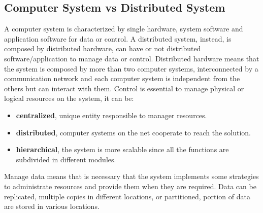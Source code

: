 \documentclass[11pt,a4paper]{article}
\begin{document}
\subsection{Computer System vs Distributed System}
A computer system is characterized by single hardware, system software and application software for data or control. A distributed system, instead, is composed by distributed hardware, can have or not distributed software/application to manage data or control.
Distributed hardware means that the system is composed by more than two computer systems, interconnected by a communication network and each computer system is independent from the others but can interact with them.
Control is essential to manage physical or logical resources on the system, it can be:
\begin{itemize}
    \item \textbf{centralized}, unique entity responsible to manager resources.
    \item \textbf{distributed}, computer systems on the net cooperate to reach the solution.
    \item \textbf{hierarchical}, the system is more scalable since all the functions are subdivided in different modules.
\end{itemize}
Manage data means that is necessary that the system implements some strategies to administrate resources and provide them when they are required. Data can be replicated, multiple copies in different locations, or partitioned, portion of data are stored in various locations.
\end{document}
